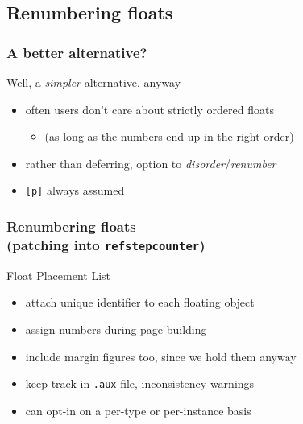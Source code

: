\documentclass{beamer}
\def\cs#1{\texttt{\expandafter\string\csname#1\endcsname}}
\begin{document}
\subsection{Renumbering floats}
\begin{frame}
  \frametitle{A better alternative?}
  \begin{block}{Well, a \emph{simpler} alternative, anyway}
    \begin{itemize}
    \item often users don't care about strictly ordered floats
      \begin{itemize}
      \item (as long as the numbers end up in the right order)
      \end{itemize}
    \item rather than deferring, option to \emph{disorder}/\emph{renumber}
    \item \texttt{[p]} always assumed
    \end{itemize}
  \end{block}
\end{frame}

\begin{frame}
  \frametitle{Renumbering floats\\\normalsize(patching into \cs{refstepcounter})}
  \begin{block}{Float Placement List}
    \begin{itemize}
    \item attach unique identifier to each floating object
    \item assign numbers during page-building
    \item include margin figures too, since we hold them anyway
    \item keep track in \texttt{.aux} file, inconsistency warnings
    \item can opt-in on a per-type or per-instance basis
    \end{itemize}
  \end{block}
\end{frame}
\end{document}

